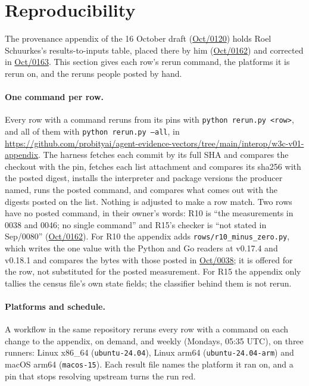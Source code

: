\providecommand{\aevmsg}[2]{\href{https://lists.w3.org/Archives/Public/public-agent-conformance/2026#1/#2.html}{#1/#2}}

\section{Reproducibility}
\label{sec:w3c-reproducibility}

The provenance appendix of the 16 October draft (\aevmsg{Oct}{0120}) holds Roel Schuurkes's results-to-inputs table, placed there by him (\aevmsg{Oct}{0162}) and corrected in \aevmsg{Oct}{0163}. This section gives each row's rerun command, the platforms it is rerun on, and the reruns people posted by hand.

\paragraph{One command per row.} Every row with a command reruns from its pins with \texttt{python rerun.py <row>}, and all of them with \texttt{python rerun.py --all}, in \url{https://github.com/probityai/agent-evidence-vectors/tree/main/interop/w3c-v01-appendix}. The harness fetches each commit by its full SHA and compares the checkout with the pin, fetches each list attachment and compares its sha256 with the posted digest, installs the interpreter and package versions the producer named, runs the posted command, and compares what comes out with the digests posted on the list. Nothing is adjusted to make a row match. Two rows have no posted command, in their owner's words: R10 is ``the measurements in 0038 and 0046; no single command'' and R15's checker is ``not stated in Sep/0080'' (\aevmsg{Oct}{0162}). For R10 the appendix adds \texttt{rows/r10\_minus\_zero.py}, which writes the one value with the Python and Go readers at v0.17.4 and v0.18.1 and compares the bytes with those posted in \aevmsg{Oct}{0038}; it is offered for the row, not substituted for the posted measurement. For R15 the appendix only tallies the census file's own state fields; the classifier behind them is not rerun.

\paragraph{Platforms and schedule.} A workflow in the same repository reruns every row with a command on each change to the appendix, on demand, and weekly (Mondays, 05:35 UTC), on three runners: Linux x86\_64 (\texttt{ubuntu-24.04}), Linux arm64 (\texttt{ubuntu-24.04-arm}) and macOS arm64 (\texttt{macos-15}). Each result file names the platform it ran on, and a pin that stops resolving upstream turns the run red.

